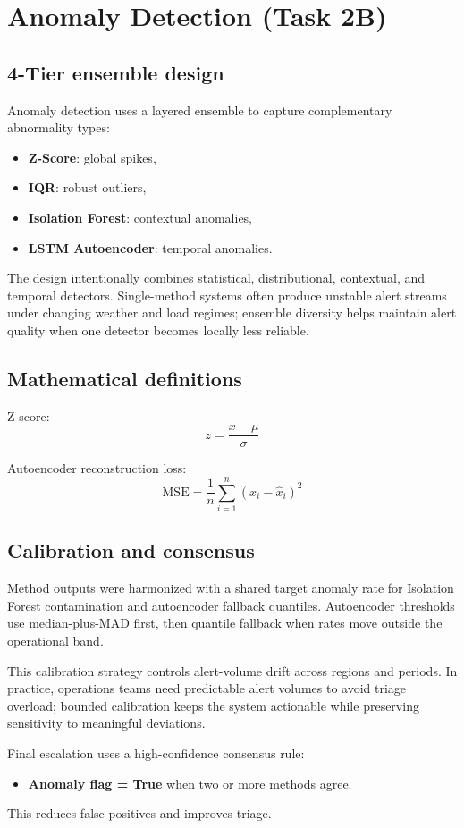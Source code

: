 \section{Anomaly Detection (Task 2B)}

\subsection{4-Tier ensemble design}
Anomaly detection uses a layered ensemble to capture complementary abnormality types:
\begin{itemize}
	\item \textbf{Z-Score}: global spikes,
	\item \textbf{IQR}: robust outliers,
	\item \textbf{Isolation Forest}: contextual anomalies,
	\item \textbf{LSTM Autoencoder}: temporal anomalies.
\end{itemize}

The design intentionally combines statistical, distributional, contextual, and temporal detectors. Single-method systems often produce unstable alert streams under changing weather and load regimes; ensemble diversity helps maintain alert quality when one detector becomes locally less reliable.

\subsection{Mathematical definitions}
Z-score:
\[
z = \frac{x - \mu}{\sigma}
\]

Autoencoder reconstruction loss:
\[
\mathrm{MSE} = \frac{1}{n}\sum_{i=1}^{n}(x_i - \hat{x}_i)^2
\]

\subsection{Calibration and consensus}
Method outputs were harmonized with a shared target anomaly rate for Isolation Forest contamination and autoencoder fallback quantiles. Autoencoder thresholds use median-plus-MAD first, then quantile fallback when rates move outside the operational band.

This calibration strategy controls alert-volume drift across regions and periods. In practice, operations teams need predictable alert volumes to avoid triage overload; bounded calibration keeps the system actionable while preserving sensitivity to meaningful deviations.

Final escalation uses a high-confidence consensus rule:
\begin{itemize}
	\item \textbf{Anomaly flag = True} when two or more methods agree.
\end{itemize}
This reduces false positives and improves triage.

